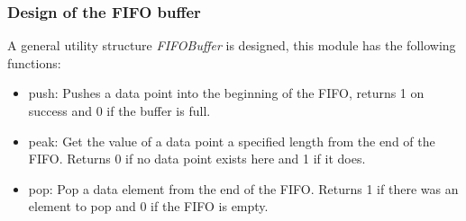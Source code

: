 \subsubsection{Design of the FIFO buffer}
A general utility structure \emph{FIFOBuffer} is designed, this module has the
following functions:
\begin{itemize}
  \item push: Pushes a data point into the beginning of the FIFO, returns 1 on
  success and 0 if the buffer is full.
  \item peak: Get the value of a data point a specified length from the end of
  the FIFO. Returns 0 if no data point exists here and 1 if it does.
  \item pop: Pop a data element from the end of the FIFO. Returns 1 if there
  was an element to pop and 0 if the FIFO is empty.
\end{itemize}
